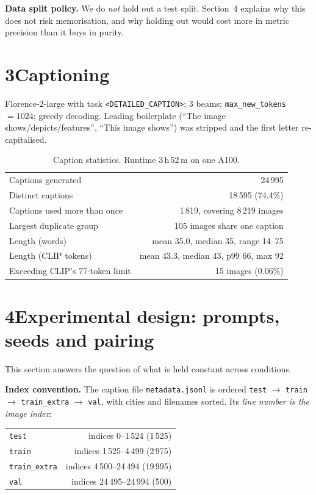 \documentclass[11pt,a4paper]{article}
\begin{document}
\textbf{Data split policy.} We do \emph{not} hold out a test split. Section~4
explains why this does not risk memorisation, and why holding out would cost
more in metric precision than it buys in purity.

\section*{3\quad Captioning}

Florence-2-large with task \texttt{<DETAILED\_CAPTION>}; 3 beams;
\texttt{max\_new\_tokens}~$=1024$; greedy decoding. Leading
boilerplate (``The image shows/depicts/features'', ``This image shows'') was
stripped and the first letter re-capitalised.

\begin{table}[h]\centering\small
\begin{tabular}{lr}
\toprule
Captions generated & 24\,995 \\
Distinct captions & 18\,595 \quad(74.4\%) \\
Captions used more than once & 1\,819, covering 8\,219 images \\
Largest duplicate group & 105 images share one caption \\
Length (words) & mean 35.0, median 35, range 14--75 \\
Length (CLIP tokens) & mean 43.3, median 43, p99 66, max 92 \\
Exceeding CLIP's 77-token limit & 15 images (0.06\%) \\
\bottomrule
\end{tabular}
\caption{Caption statistics. Runtime 3\,h\,52\,m on one A100.}
\end{table}

\section*{4\quad Experimental design: prompts, seeds and pairing}

This section answers the question of what is held constant across conditions.

\textbf{Index convention.} The caption file \texttt{metadata.jsonl} is ordered
\texttt{test} $\rightarrow$ \texttt{train} $\rightarrow$ \texttt{train\_extra}
$\rightarrow$ \texttt{val}, with cities and filenames sorted. Its \emph{line
number is the image index}:

\begin{center}\small
\begin{tabular}{lr}
\toprule
\texttt{test} & indices 0--1\,524 \quad(1\,525) \\
\texttt{train} & indices 1\,525--4\,499 \quad(2\,975) \\
\texttt{train\_extra} & indices 4\,500--24\,494 \quad(19\,995) \\
\texttt{val} & indices 24\,495--24\,994 \quad(500) \\
\bottomrule
\end{tabular}
\end{center}
\end{document}
